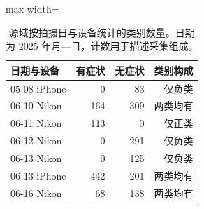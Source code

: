 \begin{table}[htbp]
\centering\small
\caption{源域按拍摄日与设备统计的类别数量。日期为 2025 年月—日，计数用于描述采集组成。}
\label{tab:daydev}
\begin{adjustbox}{max width=\linewidth}
\begin{tabular}{lrrr}
\toprule
日期与设备 & 有症状 & 无症状 & 类别构成\\
\midrule
05-08 iPhone & 0 & 83 & 仅负类\\
06-10 Nikon & 164 & 309 & 两类均有\\
06-11 Nikon & 113 & 0 & 仅正类\\
06-12 Nikon & 0 & 291 & 仅负类\\
06-13 Nikon & 0 & 125 & 仅负类\\
06-13 iPhone & 442 & 201 & 两类均有\\
06-16 Nikon & 68 & 138 & 两类均有\\
\bottomrule
\end{tabular}
\end{adjustbox}
\end{table}
